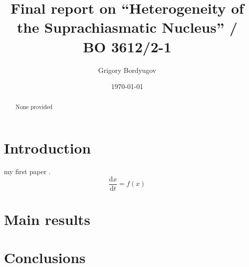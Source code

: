 \documentclass[a4paper]{article}
\title{Final report on ``Heterogeneity of the Suprachiasmatic
Nucleus'' / BO 3612/2-1}
\author{Grigory Bordyugov \mailhref{grigory.bordyugov@gmail.com}}
\date{\today}
\newcommand{\dd}{\text{d}}
\newcommand{\of}[1]{\left( {#1} \right)}
\newcommand{\fracd}[2]{\frac{\dd{}{#1}}{\dd{}{#2}}}
\begin{document}
\maketitle

\begin{abstract}
  None provided
\end{abstract}

\tableofcontents

\section{Introduction}
my first paper
\cite{bordyugov2015tuning,schmal2015theoretical,schmal2017moran,myung2017choroid,kondoff2015modeling}.
\[
\fracd{x}{t} = f\of{x}
\]

\section{Main results}
\section{Conclusions}



\end{document}
